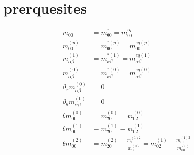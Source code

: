 \documentclass{article}
\begin{document}
  \section{prerquesites}
  \begin{align}
    m_{00} &= m_{00}^* = m_{00}^{eq}  \tag{P1}\\
    m_{00}^{(p)} &= m_{00}^{*(p)} = m_{00}^{eq(p)} \tag{P2} \\
    m_{\alpha\beta}^{(1)} &= m_{\alpha\beta}^{*(1)} = m_{\alpha\beta}^{eq(1)} \tag{P3} \\
    m_{\alpha\beta}^{(0)} &= m_{\alpha\beta}^{*(0)} = m_{\alpha\beta}^{eq(0)} \tag{P4} \\
    \partial_x m_{\alpha\beta}^{(0)} &= 0  \tag{P5} \\
    \partial_y m_{\alpha\beta}^{(0)} &= 0  \tag{P6} \\
    \theta m_{00}^{(0)} &= m_{20}^{(0)} = m_{02}^{(0)} \tag{P7} \\
    \theta m_{00}^{(1)} &= m_{20}^{(1)} = m_{02}^{(1)} \tag{P8}\\
    \theta m_{00}^{(2)} &= m_{20}^{(2)} - \frac{m_{10}^{(1)2}}{m_{00}^{(0)}}  = m_{02}^{(1)} - \frac{m_{01}^{(1)2}}{m_{00}^{(0)}} \tag{P9}
  \end{align}
\end{document}
